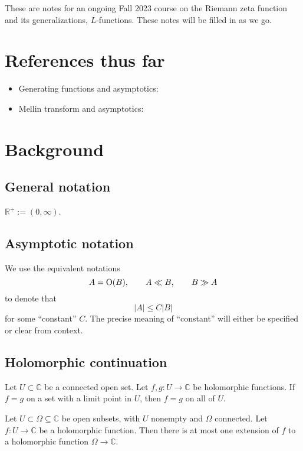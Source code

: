 \documentclass[reqno]{amsart}  \numberwithin{theorem}{section} \numberwithin{equation}{section}
\begin{document}
These are notes for an ongoing Fall 2023 course on the Riemann zeta function and its generalizations, $L$-functions.  These notes will be filled in as we go.

\newpage

\section{References thus far}
\begin{itemize}
\item Generating functions and asymptotics: \cite[\S5.2]{MR2172781}
\item Mellin transform and asymptotics: \cite{zagier-mellin}
\end{itemize}


\section{Background}

\subsection{General notation}
$\mathbb{R}^+ := (0,\infty)$.

\subsection{Asymptotic notation}
We use the equivalent notations
\begin{equation*}
  A = \operatorname{O}(B), \qquad A \ll B,
  \qquad B \gg A
\end{equation*}
to denote that
\begin{equation*}
  \lvert A \rvert \leq C \lvert B \rvert
\end{equation*}
for some ``constant'' $C$.  The precise meaning of ``constant'' will either be specified or clear from context.

\subsection{Holomorphic continuation}

\begin{theorem}
  Let $U \subset \mathbb{C} $ be a connected open set.  Let $f, g : U \rightarrow \mathbb{C} $ be holomorphic functions.  If $f = g$ on a set with a limit point in $U$, then $f = g$ on all of $U$.
\end{theorem}
\begin{corollary}\label{corollary:cj3vqbthht}
  Let $U \subset \Omega \subseteq \mathbb{C} $ be open subsets, with $U$ nonempty and $\Omega$ connected.  Let $f : U \rightarrow \mathbb{C}$ be a holomorphic function.  Then there is at most one extension of $f$ to a holomorphic function $\Omega \rightarrow \mathbb{C}$.
\end{corollary}
\end{document}
